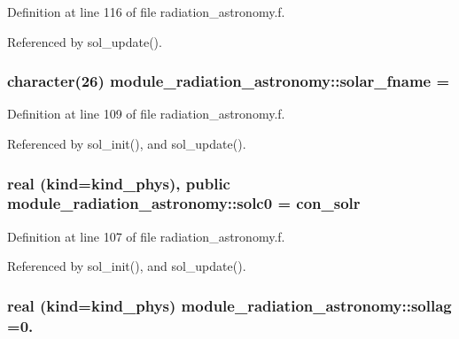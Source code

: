 Definition at line 116 of file radiation\+\_\+astronomy.\+f.



Referenced by sol\+\_\+update().

\subsubsection[{\texorpdfstring{solar\+\_\+fname}{solar_fname}}]{\setlength{\rightskip}{0pt plus 5cm}character(26) module\+\_\+radiation\+\_\+astronomy\+::solar\+\_\+fname = \textquotesingle{} \textquotesingle{}\hspace{0.3cm}{\ttfamily [private]}}\hypertarget{group__module__radiation__astronomy_ga05ee7e378d38b90242738b9bf6c40c00}{}\label{group__module__radiation__astronomy_ga05ee7e378d38b90242738b9bf6c40c00}


Definition at line 109 of file radiation\+\_\+astronomy.\+f.



Referenced by sol\+\_\+init(), and sol\+\_\+update().

\subsubsection[{\texorpdfstring{solc0}{solc0}}]{\setlength{\rightskip}{0pt plus 5cm}real (kind=kind\+\_\+phys), public module\+\_\+radiation\+\_\+astronomy\+::solc0 = con\+\_\+solr}\hypertarget{group__module__radiation__astronomy_ga37e08872f67023b11f839ac15151af09}{}\label{group__module__radiation__astronomy_ga37e08872f67023b11f839ac15151af09}


Definition at line 107 of file radiation\+\_\+astronomy.\+f.



Referenced by sol\+\_\+init(), and sol\+\_\+update().

\subsubsection[{\texorpdfstring{sollag}{sollag}}]{\setlength{\rightskip}{0pt plus 5cm}real (kind=kind\+\_\+phys) module\+\_\+radiation\+\_\+astronomy\+::sollag =0.\hspace{0.3cm}{\ttfamily [private]}}\hypertarget{group__module__radiation__astronomy_ga264a011aa71fb670339ac555dc24e486}{}\label{group__module__radiation__astronomy_ga264a011aa71fb670339ac555dc24e486}


